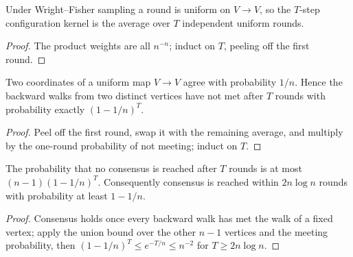 \begin{lemma}\label{lem:wf-rounds}
\leanok{}
Under Wright--Fisher sampling a round is uniform on $V\to V$, so the $T$-step
configuration kernel is the average over $T$ independent uniform rounds.
\end{lemma}
\begin{proof}\leanok
The product weights are all $n^{-n}$; induct on $T$, peeling off the first round.
\end{proof}
\begin{lemma}\label{lem:meeting}
\leanok{}
Two coordinates of a uniform map $V\to V$ agree with probability $1/n$. Hence the
backward walks from two distinct vertices have not met after $T$ rounds with
probability exactly $(1-1/n)^T$.
\end{lemma}
\begin{proof}\leanok
Peel off the first round, swap it with the remaining average, and multiply by the
one-round probability of not meeting; induct on $T$.
\end{proof}
\begin{theorem}\label{thm:consensus-time}
\leanok{}
The probability that no consensus is reached after $T$ rounds is at most
$(n-1)(1-1/n)^T$. Consequently consensus is reached within $2n\log n$ rounds with
probability at least $1-1/n$.
\end{theorem}
\begin{proof}\leanok
Consensus holds once every backward walk has met the walk of a fixed vertex; apply the
union bound over the other $n-1$ vertices and the meeting probability, then
$(1-1/n)^T\le e^{-T/n}\le n^{-2}$ for $T\ge 2n\log n$.
\end{proof}


